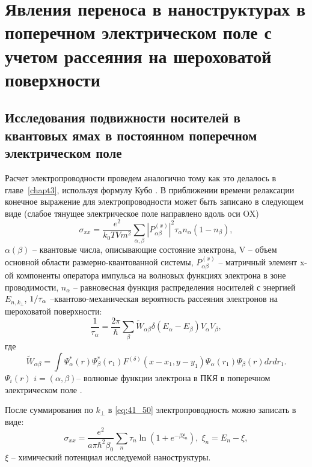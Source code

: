 \chapter{Явления переноса в наноструктурах в поперечном электрическом поле с учетом рассеяния на шероховатой поверхности} \label{chapt4}

\section{Исследования подвижности носителей в квантовых ямах в постоянном поперечном электрическом поле} \label{sect4_1}

Расчет электропроводности проведем аналогично тому как это делалось в главе~\ref{chapt3}, используя формулу Кубо \cite{Kubo1957a}. В приближении времени релаксации \cite{Khamidullin2002} конечное выражение для электропроводности может быть записано в следующем виде (слабое тянущее электрическое поле направлено вдоль оси OX)
\begin{equation} \label{eq:41_50}
\sigma _{xx} =\frac{e^{2} }{k_{0} TVm^{2} } \sum _{\alpha ,\beta }\left|P_{\alpha \beta }^{\left(x\right)} \right|^{2} \tau _{\alpha } n_{\alpha } \left(1-n_{\beta } \right) ,
\end{equation} 
$\alpha (\beta )$ -- квантовые числа, описывающие состояние электрона, V -- объем основной области размерно-квантованной системы, $P_{\alpha \beta }^{\left(x\right)} $ -- матричный элемент x-ой компоненты оператора импульса на волновых функциях электрона в зоне проводимости, $n_{\alpha } $ -- равновесная функция распределения носителей с энергией $E_{n,k_{\bot } } $, ${1 \mathord{\left/{\vphantom{1 \tau _{\alpha } }}\right.\kern-\nulldelimiterspace} \tau _{\alpha } } $ --квантово-механическая вероятность рассеяния электронов на шероховатой поверхности:
\begin{equation} \label{eq:41_60}
\frac{1}{\tau _{\alpha } } =\frac{2\pi }{\hbar } \sum _{\beta }\tilde{W}_{\alpha \beta } \delta \left(E_{\alpha } -E_{\beta } \right) V_{\alpha } V_{\beta } ,
\end{equation}
где  
\[
\tilde{W}_{\alpha \beta } =\int \Psi _{\alpha }^{*} \left(r\right)\Psi _{\beta }^{*} \left(r_{1} \right)F^{(\delta )} \left(x-x_{1} ,y-y_{1} \right)\Psi _{\alpha } \left(r_{1} \right)\Psi _{\beta } \left(r\right)drdr_{1}  .
\] 
$\Psi _{i} \left(r\right)$ $i=(\alpha ,\beta )$-- волновые функции электрона в ПКЯ в поперечном электрическом поле \cite{Sinyavskii1998}.

После суммирования по $k_{\bot } $ в \eqref{eq:41_50} электропроводность можно записать в виде:
\begin{equation} \label{eq:41_80}
\sigma _{xx} =\frac{e^2 }{a\pi \hbar^2 \beta_0 } \sum_n\tau_n \ln \left(1+e^{-\beta \xi_n } \right),\;
\xi_n =E_n -\xi ,
\end{equation}
$\xi $ -- химический потенциал исследуемой наноструктуры.

